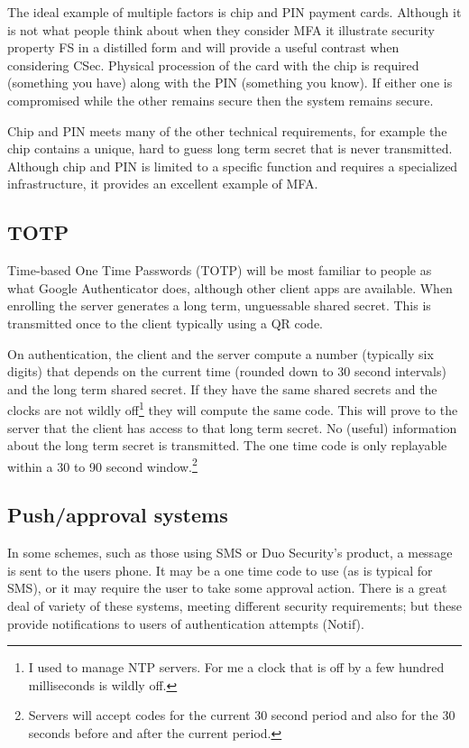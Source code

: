 \documentclass{soups}
\begin{document}
The ideal example of multiple factors is chip and PIN payment cards. Although it is not what people think about when they consider MFA it illustrate security property FS in a distilled form and will provide a useful contrast when considering CSec.
Physical procession of the card with the chip is required (something you have) along with the PIN (something you know).
If either one is compromised while the other remains secure then the system remains secure.

Chip and PIN meets many of the other technical requirements,
for example the chip contains a unique, hard to guess long term secret that is never transmitted.
Although chip and PIN is limited to a specific function and requires a specialized infrastructure, it provides an excellent example of MFA.

\subsection{TOTP}\label{sec:totp}

Time-based One Time Passwords (TOTP) will be most familiar to people as what Google Authenticator does, although other client apps are available.
When enrolling the server generates a long term, unguessable shared secret. This is transmitted once to the client typically using a QR code.

On authentication, the client and the server compute a number (typically six digits) that depends on the current time (rounded down to 30 second intervals) and the long term shared secret.
If they have the same shared secrets and the clocks are not wildly off\footnote{I used to manage NTP servers. For me a clock that is off by a few hundred milliseconds is wildly off.} they will compute the same code.
This will prove to the server that the client has access to that long term secret.
No (useful) information about the long term secret is transmitted.
The one time code is only replayable within a 30 to 90 second window.\footnote
  {Servers will accept codes for the current 30 second period and also for the 30 seconds before and after the current period.}

\subsection{Push/approval systems}\label{sec:push}

In some schemes, such as those using SMS or Duo Security's product,
a message is sent to the users phone.
It may be a one time code to use (as is typical for SMS),
or it may require the user to take some approval action.
There is a great deal of variety of these systems,
meeting different security requirements;
but these provide notifications to users of authentication
attempts (Notif).
\end{document}
